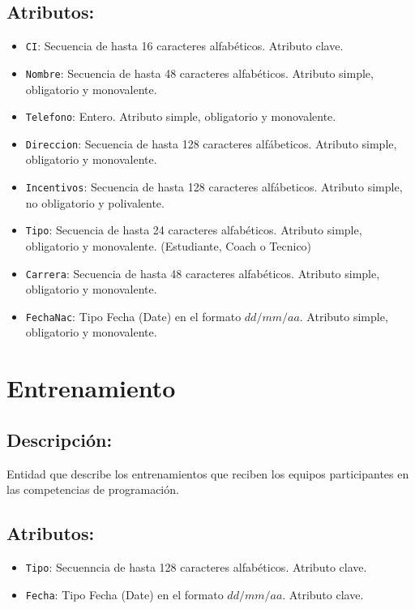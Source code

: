 \documentclass[doc, 12pt, donotrepeattitle]{apa6}
\begin{document}
\subsection*{Atributos:}
\begin{itemize}
\item \texttt{CI}: Secuencia de hasta 16 caracteres alfabéticos. Atributo clave.
\item \texttt{Nombre}: Secuencia de hasta 48 caracteres alfabéticos. Atributo simple, obligatorio y monovalente.
\item \texttt{Telefono}: Entero. Atributo simple, obligatorio y monovalente.
\item \texttt{Direccion}: Secuencia de hasta 128 caracteres alfábeticos. Atributo simple, obligatorio y monovalente.
\item \texttt{Incentivos}: Secuencia de hasta 128 caracteres alfábeticos. Atributo simple, no obligatorio y polivalente.
\item \texttt{Tipo}: Secuencia de hasta 24 caracteres alfabéticos. Atributo simple, obligatorio y monovalente. (Estudiante, Coach o Tecnico)
\item \texttt{Carrera}: Secuencia de hasta 48 caracteres alfabéticos. Atributo simple, obligatorio y monovalente.
\item \texttt{FechaNac}: Tipo Fecha (Date) en el formato $dd/mm/aa$. Atributo simple, obligatorio y monovalente.
\end{itemize}

\section*{Entrenamiento}
\subsection*{Descripción:}
Entidad que describe los entrenamientos que reciben los equipos participantes en las competencias de programación.

\subsection*{Atributos:}
\begin{itemize}
\item \texttt{Tipo}: Secuenncia de hasta 128 caracteres alfabéticos. Atributo clave.
\item \texttt{Fecha}: Tipo Fecha (Date) en el formato $dd/mm/aa$. Atributo clave.
\end{itemize}
\end{document}
